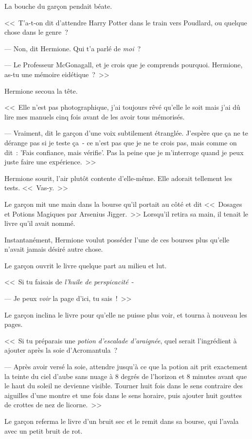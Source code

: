 La bouche du garçon pendait béate.

<<~T'a-t-on dit d'attendre Harry Potter dans le train vers Poudlard, ou quelque chose dans le genre~?

--- Non, dit Hermione. Qui t'a parlé de \emph{moi}~?

--- Le Professeur McGonagall, et je crois que je comprends pourquoi. Hermione, as-tu une mémoire eidétique~?~>>

Hermione secoua la tête.

<<~Elle n'est pas photographique, j'ai toujours rêvé qu'elle le soit mais j'ai dû lire mes manuels cinq fois avant de les avoir tous mémorisés.

--- Vraiment, dit le garçon d'une voix subtilement étranglée. J'espère que ça ne te dérange pas si je teste ça~- ce n'est pas que je ne te crois pas, mais comme on dit~: 'Fais confiance, mais vérifie'. Pas la peine que je m'interroge quand je peux juste faire une expérience.~>>

Hermione sourit, l'air plutôt contente d'elle-même. Elle adorait tellement les tests. <<~Vas-y.~>>

Le garçon mit une main dans la bourse qu'il portait au côté et dit <<~Dosages et Potions Magiques par Arsenius Jigger.~>> Lorsqu'il retira sa main, il tenait le livre qu'il avait nommé.

Instantanément, Hermione voulut posséder l'une de ces bourses plus qu'elle n'avait jamais désiré autre chose.

Le garçon ouvrit le livre quelque part au milieu et lut.

<<~Si tu faisais de \emph{l'huile de perspicacité}~-

--- Je peux \emph{voir} la page d'ici, tu sais~!~>>

Le garçon inclina le livre pour qu'elle ne puisse plus voir, et tourna à nouveau les pages.

<<~Si tu préparais une \emph{potion d'escalade d'araignée}, quel serait l'ingrédient à ajouter après la soie d'Acromantula~?

--- Après avoir versé la soie, attendre jusqu'à ce que la potion ait prit exactement la teinte du ciel d'aube sans nuage à 8 degrés de l'horizon et 8 minutes avant que le haut du soleil ne devienne visible. Tourner huit fois dans le sens contraire des aiguilles d'une montre et une fois dans le sens horaire, puis ajouter huit gouttes de crottes de nez de licorne.~>>

Le garçon referma le livre d'un bruit sec et le remit dans sa bourse, qui l'avala avec un petit bruit de rot.

